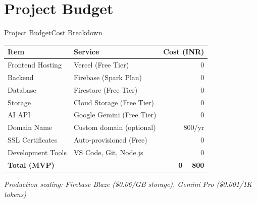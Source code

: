 \documentclass{beamer}
\begin{document}
\section{Project Budget}
\begin{frame}{Project Budget}{Cost Breakdown}
\begin{table}
\centering
\begin{tabular}{|l|l|r|}
\hline
\textbf{Item} & \textbf{Service} & \textbf{Cost (INR)} \\ \hline
Frontend Hosting & Vercel (Free Tier) & 0 \\ \hline
Backend & Firebase (Spark Plan) & 0 \\ \hline
Database & Firestore (Free Tier) & 0 \\ \hline
Storage & Cloud Storage (Free Tier) & 0 \\ \hline
AI API & Google Gemini (Free Tier) & 0 \\ \hline
Domain Name & Custom domain (optional) & 800/yr \\ \hline
SSL Certificates & Auto-provisioned (Free) & 0 \\ \hline
Development Tools & VS Code, Git, Node.js & 0 \\ \hline
\hline
\textbf{Total (MVP)} & & \textbf{0 -- 800} \\ \hline
\end{tabular}
\end{table}

\vspace{3pt}
\begin{center}
\scriptsize
\textit{Production scaling: Firebase Blaze (\$0.06/GB storage), Gemini Pro (\$0.001/1K tokens)}
\end{center}
\end{frame}

\end{document}
